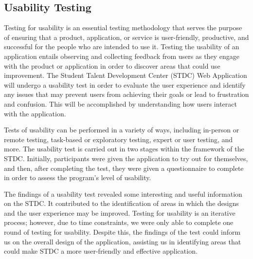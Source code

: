 \clearpage




\vspace{0.25cm}
\subsection{Usability Testing}
\begin{justify}
Testing for usability is an essential testing methodology that serves the purpose of ensuring that a product, application, or service is user-friendly, productive, and successful for the people who are intended to use it. Testing the usability of an application entails observing and collecting feedback from users as they engage with the product or application in order to discover areas that could use improvement. The Student Talent Development Center (STDC) Web Application will undergo a usability test in order to evaluate the user experience and identify any issues that may prevent users from achieving their goals or lead to frustration and confusion. This will be accomplished by understanding how users interact with the application.

\vspace{0.25cm}
\newendline Tests of usability can be performed in a variety of ways, including in-person or remote testing, task-based or exploratory testing, expert or user testing, and more. The usability test is carried out in two stages within the framework of the STDC. Initially, participants were given the application to try out for themselves, and then, after completing the test, they were given a questionnaire to complete in order to assess the program's level of usability.

\vspace{0.25cm}
\newendline The findings of a usability test revealed some interesting and useful information on the STDC. It contributed to the identification of areas in which the designs and the user experience may be improved. Testing for usability is an iterative process; however, due to time constraints, we were only able to complete one round of testing for usability. Despite this, the findings of the test could inform us on the overall design of the application, assisting us in identifying areas that could make STDC a more user-friendly and effective application.


\end{justify}
